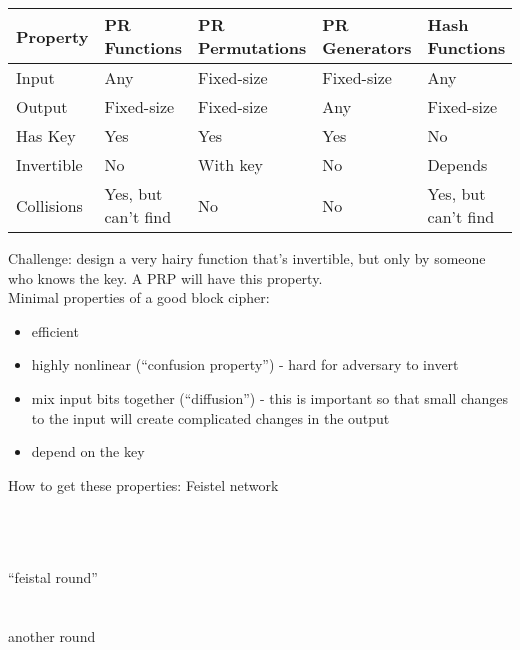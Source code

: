 \begin{center}
\begin{tabular}{l|llll}
 Property    &  PR Functions         &  PR Permutations  &  PR Generators  &  Hash Functions       \\
\hline
 Input       &  Any                  &  Fixed-size       &  Fixed-size     &  Any                  \\
 Output      &  Fixed-size           &  Fixed-size       &  Any            &  Fixed-size           \\
 Has Key     &  Yes                  &  Yes              &  Yes            &  No                   \\
 Invertible  &  No                   &  With key         &  No             &  Depends              \\
 Collisions  &  Yes, but can't find  &  No               &  No             &  Yes, but can't find  \\
\end{tabular}
\end{center}

Challenge: design a very hairy function that's invertible, but only by someone
who knows the key. A PRP will have this property.\\

Minimal properties of a good block cipher:
\begin{itemize}
    \item efficient
    \item highly nonlinear (``confusion property'') - hard for adversary to
        invert
    \item mix input bits together (``diffusion'') - this is important so that
        small changes to the input will create complicated changes in the output
    \item depend on the key
\end{itemize}

How to get these properties: Feistel network

\\
\\
\makebox[6cm]{\makebox[1cm]{$\downarrow$}\makebox[4cm]{}\makebox[1cm]{$\downarrow$}}\\
   ``feistal round''\\
\makebox[6cm]{\makebox[1cm]{$\downarrow$}\makebox[4cm]{}\makebox[1cm]{$\downarrow$}}\\
\makebox[6cm]{------------------------------------------------}\\
   another round\\
\makebox[6cm]{\makebox[1cm]{$\downarrow$}\makebox[4cm]{}\makebox[1cm]{$\downarrow$}}\\

